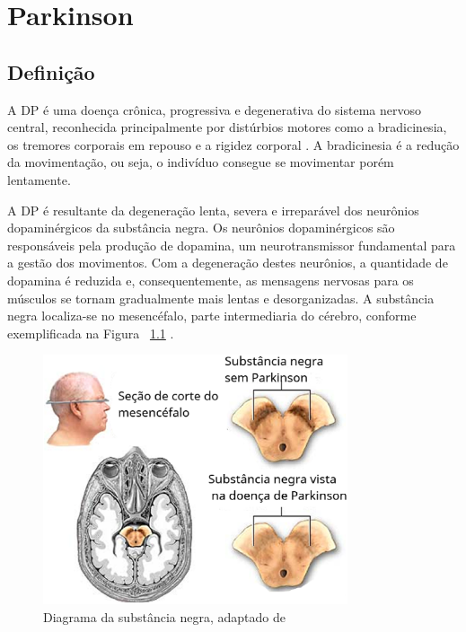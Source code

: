 \chapter{Parkinson}
\section{Definição}

A DP é uma doença crônica, progressiva e degenerativa do sistema nervoso central, reconhecida principalmente por distúrbios motores como a bradicinesia, os tremores corporais em repouso e a rigidez corporal \cite{da2016aspectos}. A bradicinesia é a redução da movimentação, ou seja, o indivíduo consegue se movimentar porém lentamente. 

A DP é resultante da degeneração lenta, severa e irreparável dos neurônios dopaminérgicos da substância negra. Os neurônios dopaminérgicos são responsáveis pela produção de dopamina, um neurotransmissor fundamental para a gestão dos movimentos. Com a degeneração destes neurônios, a quantidade de dopamina é reduzida e, consequentemente, as mensagens nervosas para os músculos se tornam gradualmente mais lentas e desorganizadas. A substância negra localiza-se no mesencéfalo, parte intermediaria do cérebro, conforme exemplificada na Figura ~\ref{substanciaNegra} \cite{eftaxias2015detection}.

\begin{figure}[!htb]
	\centering
	\includegraphics[width=0.8\textwidth]{figuras/subNegra.eps}
	\caption{Diagrama da substância negra, adaptado de }
	\label{substanciaNegra}
\end{figure}

